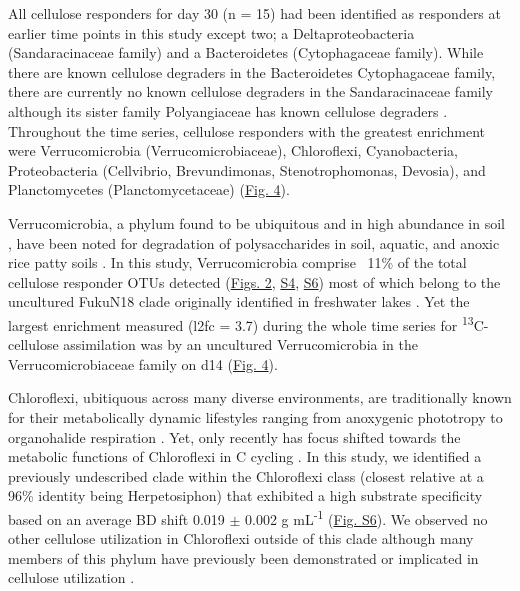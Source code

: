 All cellulose responders for day 30 (n = 15) had been identified as responders at earlier time points in this study except two; a Deltaproteobacteria (Sandaracinaceae family) and a Bacteroidetes (Cytophagaceae family). While there are known cellulose degraders in the Bacteroidetes Cytophagaceae family, there are currently no known cellulose degraders in the Sandaracinaceae family although its sister family Polyangiaceae has known cellulose degraders \cite{Reichenbach_2006, boone2001bergeys2}. Throughout the time series, cellulose responders with the greatest enrichment were Verrucomicrobia (Verrucomicrobiaceae), Chloroflexi, Cyanobacteria, Proteobacteria (Cellvibrio, Brevundimonas, Stenotrophomonas, Devosia), and Planctomycetes (Planctomycetaceae) (\href{https://authorea.com/users/3537/articles/3612/master/file/figures/bacteria_tree/bacteria_tree.png}{Fig. 4}).      

Verrucomicrobia, a phylum found to be ubiquitous and in high abundance in soil \cite{Fierer_2013}, have been noted for degradation of polysaccharides in soil, aquatic, and anoxic rice patty soils \cite{Fierer_2013,Herlemann_2013,10543821}. In this study, Verrucomicrobia comprise ~11\% of the total cellulose responder OTUs detected (\href{https://www.authorea.com/users/3537/articles/3612/master/file/figures/l2fc_fig1/l2fc_fig.pdf}{Figs. 2}, \href{https://authorea.com/users/3537/articles/8459/master/file/figures/l2fc_fig_pVal/l2fc_fig_pVal.png}{S4}, \href{https://authorea.com/users/3537/articles/8459/master/file/figures/cellulose_resp_profiles/cellulose_resp_profiles.png}{S6}) most of which belong to the uncultured FukuN18 clade originally identified in freshwater lakes \cite{Parveen_2013}. Yet the largest enrichment measured (l2fc = 3.7) during the whole time series for \textsuperscript{13}C-cellulose assimilation was by an uncultured Verrucomicrobia in the Verrucomicrobiaceae family on d14 (\href{https://authorea.com/users/3537/articles/3612/master/file/figures/bacteria_tree/bacteria_tree.png}{Fig. 4}). 

Chloroflexi, ubitiquous across many diverse environments, are traditionally known for their metabolically dynamic lifestyles ranging from anoxygenic phototropy to organohalide respiration \cite{Hug_2013}. Yet, only recently has focus shifted towards the metabolic functions of Chloroflexi in C cycling \cite{Hug_2013,Goldfarb_2011,Cole_2013}. In this study, we identified a previously undescribed clade within the Chloroflexi class (closest relative at a 96\% identity being Herpetosiphon) that exhibited a high substrate specificity based on an average BD shift 0.019 $\pm$ 0.002 g mL\textsuperscript{-1} (\href{https://authorea.com/users/3537/articles/8459/master/file/figures/cellulose_resp_profiles/cellulose_resp_profiles.png}{Fig. S6}). We observed no other cellulose utilization in Chloroflexi outside of this clade although many members of this phylum have previously been demonstrated or implicated in cellulose utilization \cite{Goldfarb_2011,Cole_2013,Hug_2013}. 

